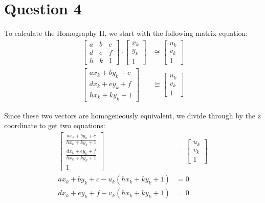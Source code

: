 \documentclass{article} %
\begin{document}
\section{Question 4}

To calculate the Homography H, we start with the following matrix equation:\\
\begin{align*}
\left[
\begin{matrix}
a & b & c\\
d & e & f\\
h & k & 1
\end{matrix}
\right]
\cdot
\left[
\begin{matrix}
x_k\\
y_k\\
1
\end{matrix}
\right]
&\cong
\left[
\begin{matrix}
u_k\\
v_k\\
1
\end{matrix}
\right]\\
\left[
\begin{matrix}
a x_k + b y_k + c\\
d x_k + e y_k + f\\
h x_k + k y_k + 1
\end{matrix}
\right]
&\cong
\left[
\begin{matrix}
u_k\\
v_k\\
1
\end{matrix}
\right]
\end{align*}

Since these two vectors are homogeneously equivalent, we divide through by the z coordinate to get two equations:\\
\begin{align*}
\left[
\begin{matrix}
\frac{a x_k + b y_k + c}{h x_k + k y_k + 1}\\
\frac{d x_k + e y_k + f}{h x_k + k y_k + 1}\\
1
\end{matrix}
\right]
&=
\left[
\begin{matrix}
u_k\\
v_k\\
1
\end{matrix}
\right]\\
a x_k + b y_k + c - u_k (h x_k + k y_k + 1) &= 0\\
d x_k + e y_k + f - v_k (h x_k + k y_k + 1) &= 0
\end{align*}
\end{document}
